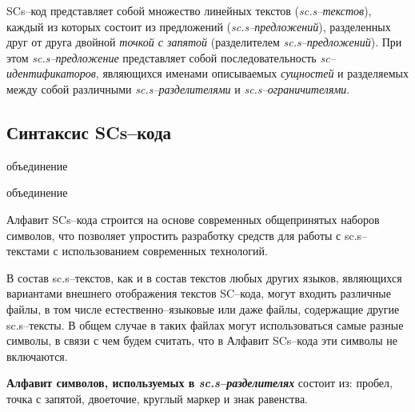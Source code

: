 SCs--код представляет собой множество линейных текстов (\textit{sc.s--текстов}), каждый из которых состоит из предложений (\textit{sc.s--предложений}), разделенных друг от друга двойной \textit{точкой с запятой} (разделителем \textit{sc.s--предложений}). При этом \mbox{\textit{sc.s--предложение}} представляет собой последовательность \textit{sc--идентификаторов}, являющихся именами описываемых \textit{сущностей} и разделяемых между собой различными \textit{sc.s--разделителями} и \textit{sc.s--ограничителями}.


\subsection{Синтаксис SCs--кода}

\begin{SCn}
	\begin{scnreltoset}{объединение}
			\begin{scnreltoset}{объединение}
			\end{scnreltoset}
	\end{scnreltoset}
\end{SCn} 


Алфавит SCs--кода строится на основе современных общепринятых наборов символов, что позволяет упростить разработку средств для работы с sc.s--текстами с использованием современных технологий.

В состав sc.s--текстов, как и в состав текстов любых других языков, являющихся вариантами внешнего отображения текстов SC--кода, могут входить различные файлы, в том числе естественно--языковые или даже файлы, содержащие другие sc.s--тексты. В общем случае в таких файлах могут использоваться самые разные символы, в связи с чем будем считать, что в Алфавит SCs--кода эти символы не включаются.


\textbf{Алфавит символов, используемых в \textit{sc.s--разделителях}} состоит из: пробел, точка с запятой, двоеточие, круглый маркер и знак равенства.


